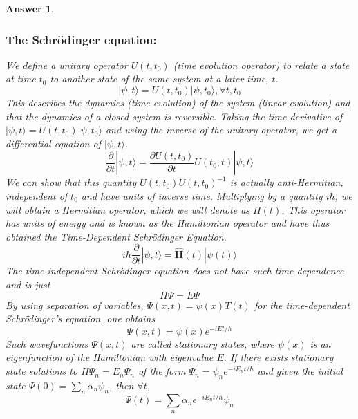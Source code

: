 \documentclass[a4paper]{article}
\newtheorem{ans}{Answer}[subsection]
\theoremstyle{new}
\begin{document}
\begin{ans}
\subsubsection*{The Schr\"{o}dinger equation:}
We define a unitary operator $U(t,t_0)$ (time evolution operator) to relate a state at time $t_0$ to another state of the same system at a later time, $t$.
$$|\psi,t\big\rangle=U(t,t_0)|\psi,t_0\big\rangle, \forall t,t_0$$
This describes the dynamics (time evolution) of the system (linear evolution) and that the dynamics of a closed system is reversible. Taking the time derivative of $|\psi,t\rangle=U(t,t_0)|\psi,t_0\rangle$ and using the inverse of the unitary operator, we get a differential equation of $|\psi,t\big\rangle$.
$$
\frac{\partial}{\partial t}|\psi,t\big\rangle=\frac{\partial U(t,t_0)}{\partial t}U(t_0,t)|\psi,t\big\rangle
$$
We can show that this quantity $U(t,t_0)U(t,t_0)^{-1}$ is actually anti-Hermitian, independent of $t_0$ and have units of inverse time. Multiplying by a quantity $i\hbar$, we will obtain a Hermitian operator, which we will denote as $H(t)$. This operator has units of energy and is known as the Hamiltonian operator and have thus obtained the Time-Dependent Schr\"{o}dinger Equation.
$$i\hbar\frac{\partial}{\partial t}|\psi,t\rangle=\mathbf{\hat{H}}(t)|\psi(t)\rangle$$
The time-independent Schr\"{o}dinger equation does not have such time dependence and is just
$$H\Psi=E\Psi$$
By using separation of variables, $\Psi(x,t)=\psi(x)T(t)$ for the time-dependent Schr\"{o}dinger's equation, one obtains 
$$\Psi(x,t)=\psi(x)e^{-iEt/\hbar}$$
Such wavefunctions $\Psi(x,t)$ are called stationary states, where $\psi(x)$ is an eigenfunction of the Hamiltonian with eigenvalue $E$. If there exists stationary state solutions to $H\Psi_n=E_n\Psi_n$ of the form $\Psi_n=\psi_ne^{-iE_nt/\hbar}$ and given the initial state $\Psi(0)=\sum_n\alpha_n\psi_n$, then $\forall t$,
$$\Psi(t)=\sum_n\alpha_ne^{-iE_nt/\hbar}\psi_n$$
\end{ans}
\newpage
\end{document}
